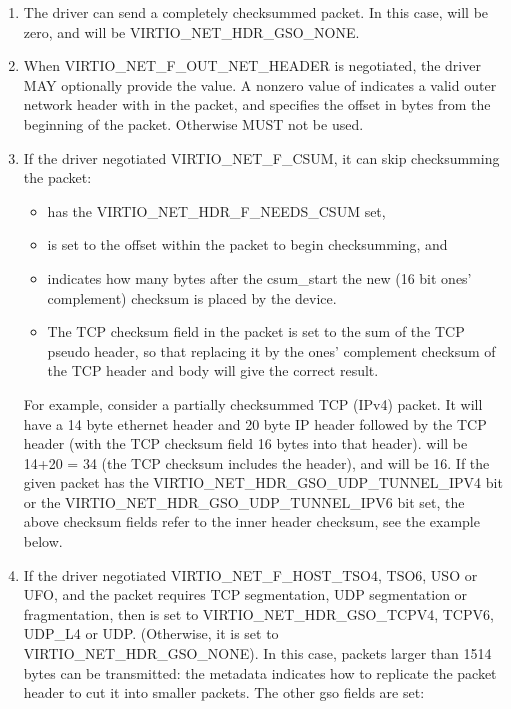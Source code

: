 \begin{enumerate}
\item The driver can send a completely checksummed packet.  In this case,
   will be zero, and  will be VIRTIO_NET_HDR_GSO_NONE.

\item When VIRTIO_NET_F_OUT_NET_HEADER is negotiated, the driver MAY optionally provide
   the  value. A nonzero value of  indicates
   a valid outer network header with in the packet, and specifies the offset in bytes from
   the beginning of the packet. Otherwise  MUST not be used.

\item If the driver negotiated VIRTIO_NET_F_CSUM, it can skip
  checksumming the packet:
  \begin{itemize}
  \item {} has the VIRTIO_NET_HDR_F_NEEDS_CSUM set,

  \item {} is set to the offset within the packet to begin checksumming,
    and

  \item {} indicates how many bytes after the csum_start the
    new (16 bit ones' complement) checksum is placed by the device.

  \item The TCP checksum field in the packet is set to the sum
    of the TCP pseudo header, so that replacing it by the ones'
    complement checksum of the TCP header and body will give the
    correct result.
  \end{itemize}

\begin{note}
For example, consider a partially checksummed TCP (IPv4) packet.
It will have a 14 byte ethernet header and 20 byte IP header
followed by the TCP header (with the TCP checksum field 16 bytes
into that header).  will be 14+20 = 34 (the TCP
checksum includes the header), and  will be 16.
If the given packet has the VIRTIO_NET_HDR_GSO_UDP_TUNNEL_IPV4 bit or the
VIRTIO_NET_HDR_GSO_UDP_TUNNEL_IPV6 bit set,
the above checksum fields refer to the inner header checksum, see
the example below.
\end{note}

\item If the driver negotiated
  VIRTIO_NET_F_HOST_TSO4, TSO6, USO or UFO, and the packet requires
  TCP segmentation, UDP segmentation or fragmentation, then 
  is set to VIRTIO_NET_HDR_GSO_TCPV4, TCPV6, UDP_L4 or UDP.
  (Otherwise, it is set to VIRTIO_NET_HDR_GSO_NONE). In this
  case, packets larger than 1514 bytes can be transmitted: the
  metadata indicates how to replicate the packet header to cut it
  into smaller packets. The other gso fields are set:


\end{enumerate}
